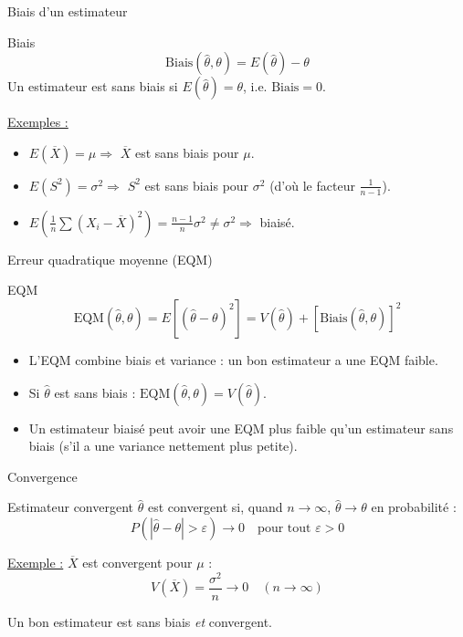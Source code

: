 \documentclass{BeamerTemplate}
\begin{document}
\begin{frame}[t]{Biais d'un estimateur}

\begin{Boite}{Biais}
$$\text{Biais}(\hat{\theta},\theta) = E(\hat{\theta}) - \theta$$
Un estimateur est \alert{sans biais} si $E(\hat{\theta}) = \theta$, i.e. $\text{Biais} = 0$.
\end{Boite}

\medskip
\underline{Exemples :}
\begin{itemize}\itemsep4mm
  \item $E(\overline{X}) = \mu \Rightarrow$ $\overline{X}$ est \alert{sans biais} pour $\mu$.
  \item $E(S^2) = \sigma^2 \Rightarrow$ $S^2$ est \alert{sans biais} pour $\sigma^2$ (d'où le facteur $\frac{1}{n-1}$).
  \item $E\!\left(\frac{1}{n}\sum(X_i-\overline{X})^2\right) = \frac{n-1}{n}\sigma^2 \neq \sigma^2 \Rightarrow$ biaisé.
\end{itemize}

\end{frame}

\begin{frame}[t]{Erreur quadratique moyenne (EQM)}

\begin{Boite}{EQM}
$$\text{EQM}(\hat{\theta},\theta) = E\!\left[(\hat{\theta}-\theta)^2\right] = V(\hat{\theta}) + \left[\text{Biais}(\hat{\theta},\theta)\right]^2$$
\end{Boite}

\medskip
\begin{itemize}\itemsep5mm
  \item L'EQM combine biais et variance : un bon estimateur a une EQM faible.
  \item Si $\hat{\theta}$ est sans biais : $\text{EQM}(\hat{\theta},\theta) = V(\hat{\theta})$.
  \item Un estimateur biaisé peut avoir une EQM plus faible qu'un estimateur sans biais (s'il a une variance nettement plus petite).
\end{itemize}

\end{frame}

\begin{frame}[t]{Convergence}

\begin{Boite}{Estimateur convergent}
$\hat{\theta}$ est convergent si, quand $n \to \infty$, $\hat{\theta} \to \theta$ en probabilité :
$$P(|\hat{\theta} - \theta| > \varepsilon) \to 0 \quad \text{pour tout } \varepsilon > 0$$
\end{Boite}

\medskip
\underline{Exemple :} $\overline{X}$ est convergent pour $\mu$ :
$$V(\overline{X}) = \frac{\sigma^2}{n} \to 0 \quad (n \to \infty)$$

\medskip
Un bon estimateur est sans biais \emph{et} convergent.

\end{frame}
\end{document}
